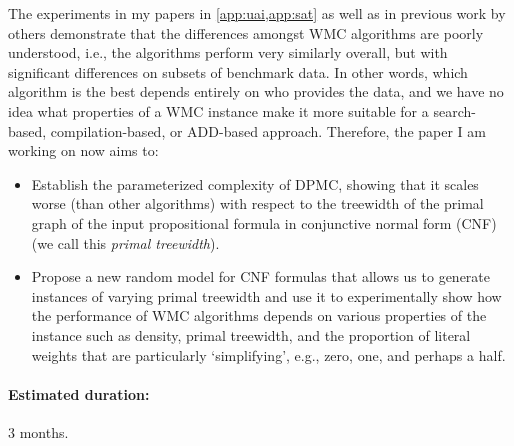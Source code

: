 \documentclass{article}
\begin{document}
The experiments in my papers in \cref{app:uai,app:sat} as well as in previous
work by others \cite{DBLP:conf/aaai/DudekPV20,DBLP:conf/cp/DudekPV20}
demonstrate that the differences amongst WMC algorithms are poorly understood,
i.e., the algorithms perform very similarly overall, but with significant
differences on subsets of benchmark data. In other words, which algorithm is the
best depends entirely on who provides the data, and we have no idea what
properties of a WMC instance make it more suitable for a search-based,
compilation-based, or ADD-based approach. Therefore, the paper I am working on
now aims to:
\begin{itemize}
\item Establish the parameterized complexity of DPMC, showing that it scales
  worse (than other algorithms) with respect to the treewidth of the primal
  graph of the input propositional formula in conjunctive normal form (CNF) (we
  call this \emph{primal treewidth}).
\item Propose a new random model for CNF formulas that allows us to generate
  instances of varying primal treewidth and use it to experimentally show how
  the performance of WMC algorithms depends on various properties of the
  instance such as density, primal treewidth, and the proportion of literal
  weights that are particularly `simplifying', e.g., zero, one, and perhaps a
  half.
\end{itemize}

\paragraph{Estimated duration:} 3 months.
\end{document}
